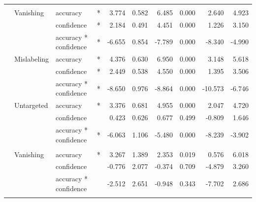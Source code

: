 \documentclass[
]{article}
\begin{document}
\begin{longtable}[t]{llllrrrrrr}
\cmidrule{1-10}\pagebreak[0]
\addlinespace[0.3em]
\multicolumn{10}{l}{\textbf{SSD}}\\
\hspace{1em} & Vanishing & accuracy & * & 3.774 & 0.582 & 6.485 & 0.000 & 2.640 & 4.923\\
\cmidrule{3-10}\nopagebreak
\hspace{1em} &  & confidence & * & 2.184 & 0.491 & 4.451 & 0.000 & 1.226 & 3.150\\
\cmidrule{3-10}\nopagebreak
\hspace{1em} &  & accuracy * confidence & * & -6.655 & 0.854 & -7.789 & 0.000 & -8.340 & -4.990\\
\cmidrule{2-10}\nopagebreak
\hspace{1em} & Mislabeling & accuracy & * & 4.376 & 0.630 & 6.950 & 0.000 & 3.148 & 5.618\\
\cmidrule{3-10}\nopagebreak
\hspace{1em} &  & confidence & * & 2.449 & 0.538 & 4.550 & 0.000 & 1.395 & 3.506\\
\cmidrule{3-10}\nopagebreak
\hspace{1em} &  & accuracy * confidence & * & -8.650 & 0.976 & -8.864 & 0.000 & -10.573 & -6.746\\
\cmidrule{2-10}\nopagebreak
\hspace{1em} & Untargeted & accuracy & * & 3.376 & 0.681 & 4.955 & 0.000 & 2.047 & 4.720\\
\cmidrule{3-10}\nopagebreak
\hspace{1em} &  & confidence &  & 0.423 & 0.626 & 0.677 & 0.499 & -0.809 & 1.646\\
\cmidrule{3-10}\nopagebreak
\hspace{1em} &  & accuracy * confidence & * & -6.063 & 1.106 & -5.480 & 0.000 & -8.239 & -3.902\\
\cmidrule{1-10}\pagebreak[0]
\addlinespace[0.3em]
\multicolumn{10}{l}{\textbf{RetinaNet}}\\
\hspace{1em} & Vanishing & accuracy & * & 3.267 & 1.389 & 2.353 & 0.019 & 0.576 & 6.018\\
\cmidrule{3-10}\nopagebreak
\hspace{1em} &  & confidence &  & -0.776 & 2.077 & -0.374 & 0.709 & -4.879 & 3.260\\
\cmidrule{3-10}\nopagebreak
\hspace{1em} &  & accuracy * confidence &  & -2.512 & 2.651 & -0.948 & 0.343 & -7.702 & 2.686\\
\cmidrule{2-10}\nopagebreak

\end{longtable}
\end{document}
